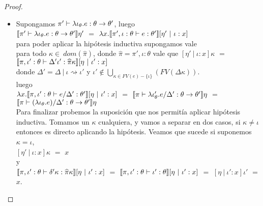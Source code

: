 \begin{proof}
\begin{itemize}
\begin{itemize}
\item Supongamos $\pi' \vdash \lambda \iota_{\theta} . e : \theta \rightarrow \theta'$, luego\\

$\llbracket \pi' \vdash \lambda \iota_{\theta} . e : \theta \rightarrow \theta' \rrbracket\eta'$ $=$
$\lambda x . \llbracket \pi',\iota:\theta \vdash e : \theta' \rrbracket[ \eta' \ | \ \iota:x ]$ \\

para poder aplicar la hip\'otesis inductiva supongamos vale\\

para todo $\kappa \in \ dom(\widehat{\pi})$, donde $\widehat{\pi} = \pi',\iota:\theta$ vale
que $[ \eta' \ | \ \iota:x ]\kappa$ $=$ 
$\llbracket \pi,\iota':\theta \vdash \Delta'\iota': \widehat{\pi}\kappa \rrbracket[ \eta \ | \ \iota':x ]$\\

donde $\Delta' = \Delta \ | \ \iota \rightsquigarrow \iota' $ y 
$\iota' \not\in \bigcup\limits_{\kappa \in FV(e)-\{\iota\}} (FV(\Delta\kappa))$.\\

luego\\

$\lambda x . \llbracket \pi,\iota':\theta \vdash e / \Delta' : \theta' \rrbracket[ \eta \ | \ \iota':x ]$ $=$
$\llbracket \pi \vdash \lambda \iota'_{\theta} . e / \Delta' : \theta \rightarrow \theta' \rrbracket\eta$ $=$
$\llbracket \pi \vdash (\lambda \iota_{\theta} . e) / \Delta' : \theta \rightarrow \theta' \rrbracket\eta$\\

Para finalizar probemos la suposici\'on que nos permit\'ia aplicar hip\'otesis inductiva.
Tomamos un $\kappa$ cualquiera, y vamos a separar en dos casos, si $\kappa \not= \iota$ entonces
es directo aplicando la hip\'otesis. Veamos que sucede si suponemos $\kappa = \iota$,\\

$[ \eta' \ | \ \iota:x ]\kappa$ $=$ $x$\\

y\\

$\llbracket \pi,\iota':\theta \vdash \delta'\kappa : \widehat{\pi}\kappa \rrbracket[ \eta \ | \ \iota':x ]$ $=$
$\llbracket \pi,\iota':\theta \vdash \iota' : \theta \rrbracket[ \eta \ | \ \iota':x ]$ $=$
$[ \eta \ | \ \iota':x ]\iota'$ $=$ $x$.

\end{itemize}
\end{itemize}
\end{proof}

